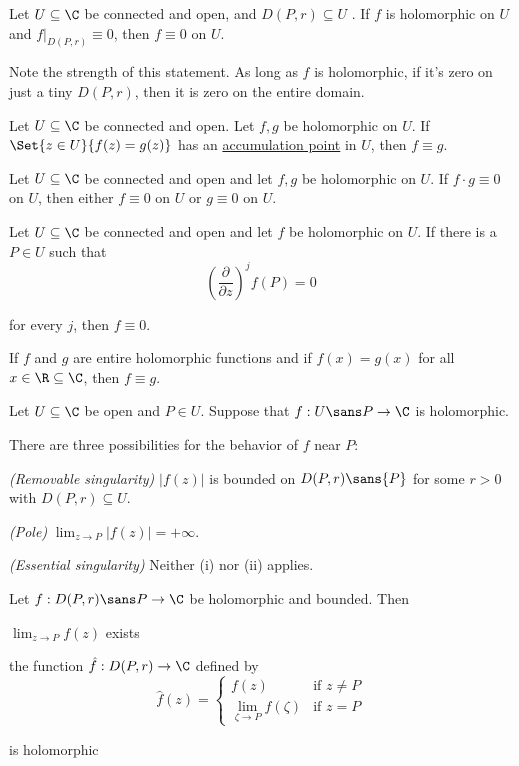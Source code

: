 \label{b919101}

Let $U\subseteq\C$ be connected and open, and $D(P,r)\subseteq U$ . If $f$ is
holomorphic on $U$ and $f|_{D(P,r)}\equiv0$, then $f\equiv0$ on $U$.

Note the strength of this statement. As long as $f$ is holomorphic, if it's
zero on just a tiny $D(P,r)$, then it is zero on the entire domain.

\label{ac6f6ea}

Let $U\subseteq\C$ be connected and open. Let $f,g$ be holomorphic on $U$. If
$\Set{z\in U}{f(z)=g(z)}$ has an \href{b0219cd}{accumulation point} in $U$,
then $f\equiv g$.

\label{faf57f7}

Let $U\subseteq\C$ be connected and open and let $f,g$ be holomorphic on $U$.
If $f\cdot g\equiv0$ on $U$, then either $f\equiv0$ on $U$ or $g\equiv0$ on
$U$.

\label{dccfe6b}

Let $U\subseteq\C$ be connected and open and let $f$ be holomorphic on $U$. If
there is a $P\in U$ such that
$$
  \left(\frac\partial{\partial z}\right)^jf(P)=0
$$

for every $j$, then $f\equiv0$.

\label{bd8ae3b}

If $f$ and $g$ are entire holomorphic functions and if $f(x)=g(x)$ for all
$x\in\R\subseteq\C$, then $f\equiv g$.

\label{a7f062e}

Let $U\subseteq\C$ be open and $P\in U$. Suppose that $f:U\sans P\to\C$ is
holomorphic.

There are three possibilities for the behavior of $f$ near $P$:
\begin{enumerati}
  \item \textit{(Removable singularity)} $|f(z)|$ is bounded on $D(P,r)\sans{P}$
  for some $r>0$ with $D(P,r)\subseteq U$.
  \item \textit{(Pole)} $\lim_{z\to P}|f(z)|=+\infty$.
  \item \textit{(Essential singularity)} Neither (i) nor (ii) applies.
\end{enumerati}

\label{f42a663}

Let $f:D(P,r)\sans P\to\C$ be holomorphic and bounded. Then
\begin{enumerata}
  \item $\lim_{z\to P}f(z)$ exists
  \item the function $\hat f:D(P,r)\to\C$ defined by
  $$
    \hat f(z)=\begin{cases}
      f(z)                                   & \text{if }z\neq P \\
      \displaystyle\lim_{\zeta\to P}f(\zeta) & \text{if }z=P
    \end{cases}
  $$

  is holomorphic
\end{enumerata}

